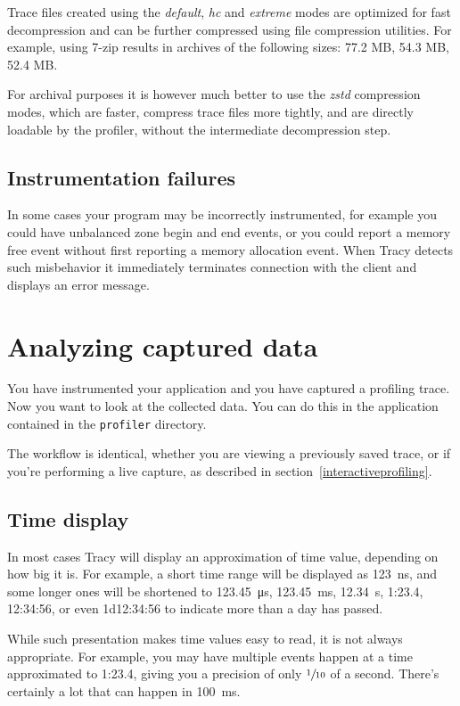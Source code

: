 \documentclass[hidelinks,titlepage,a4paper]{article}
\begin{document}
Trace files created using the \emph{default}, \emph{hc} and \emph{extreme} modes are optimized for fast decompression and can be further compressed using file compression utilities. For example, using 7-zip results in archives of the following sizes: 77.2 MB, 54.3 MB, 52.4 MB.

For archival purposes it is however much better to use the \emph{zstd} compression modes, which are faster, compress trace files more tightly, and are directly loadable by the profiler, without the intermediate decompression step.

\subsection{Instrumentation failures}
\label{instrumentationfailures}

In some cases your program may be incorrectly instrumented, for example you could have unbalanced zone begin and end events, or you could report a memory free event without first reporting a memory allocation event. When Tracy detects such misbehavior it immediately terminates connection with the client and displays an error message.

\section{Analyzing captured data}
\label{analyzingdata}

You have instrumented your application and you have captured a profiling trace. Now you want to look at the collected data. You can do this in the application contained in the \texttt{profiler} directory.

The workflow is identical, whether you are viewing a previously saved trace, or if you're performing a live capture, as described in section~\ref{interactiveprofiling}.

\subsection{Time display}

In most cases Tracy will display an approximation of time value, depending on how big it is. For example, a short time range will be displayed as 123~\si{\nano\second}, and some longer ones will be shortened to 123.45~\si{\micro\second}, 123.45~\si{\milli\second}, 12.34~\si{\second}, 1:23.4, 12:34:56, or even 1d12:34:56 to indicate more than a day has passed.

While such presentation makes time values easy to read, it is not always appropriate. For example, you may have multiple events happen at a time approximated to 1:23.4, giving you a precision of only $\sfrac{1}{10}$ of a second. There's certainly a lot that can happen in 100~\si{\milli\second}.
\end{document}
